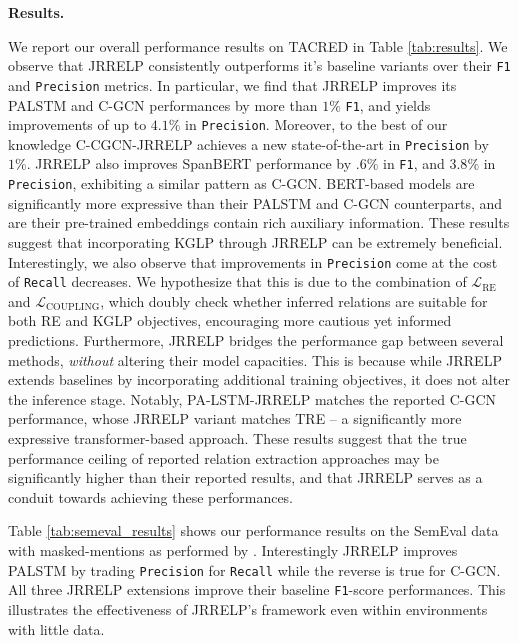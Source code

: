 \textbf{Results.}


We report our overall performance results on TACRED in Table \ref{tab:results}. We observe that JRRELP consistently outperforms it's baseline variants over their \texttt{F1} and \texttt{Precision} metrics.
In particular, we find that JRRELP improves its PALSTM and C-GCN performances by more than $1\%$ \texttt{F1}, and yields improvements of up to $4.1\%$ in \texttt{Precision}. 
Moreover, to the best of our knowledge C-CGCN-JRRELP achieves a new state-of-the-art in \texttt{Precision} by $1\%$.
JRRELP also improves SpanBERT performance by $.6\%$ in \texttt{F1}, and $3.8\%$ in \texttt{Precision}, exhibiting a similar pattern as C-GCN. BERT-based models are significantly more expressive than their PALSTM and C-GCN counterparts, and are their pre-trained embeddings contain rich auxiliary information. These results suggest that incorporating KGLP through JRRELP can be extremely beneficial. 
Interestingly, we also observe that improvements in \texttt{Precision} come at the cost of \texttt{Recall} decreases. We hypothesize that this is due to the combination of $\mathcal{L}_{\text{RE}}$ and $\mathcal{L}_{\text{COUPLING}}$, which doubly check whether inferred relations are suitable for both RE and KGLP objectives, encouraging more cautious yet informed predictions. 
Furthermore, JRRELP bridges the performance gap between several methods, {\em without} altering their model capacities. This is because while JRRELP extends baselines by incorporating additional training objectives, it does not alter the inference stage.
Notably, PA-LSTM-JRRELP matches the reported C-GCN performance, whose JRRELP variant matches TRE -- a significantly more expressive transformer-based approach. 
These results suggest that the true performance ceiling of reported relation extraction approaches may be significantly higher than their reported results, and that JRRELP serves as a conduit towards achieving these performances.

Table \ref{tab:semeval_results} shows our performance results on the SemEval data with masked-mentions as performed by \cite{palstm,cgcn}. Interestingly JRRELP improves PALSTM by trading \texttt{Precision} for \texttt{Recall} while the reverse is true for C-GCN. 
All three JRRELP extensions improve their baseline \texttt{F1}-score performances. This illustrates the effectiveness of JRRELP's framework even within environments with little data.  


